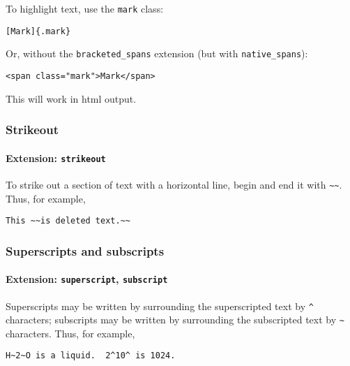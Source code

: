 \documentclass[
]{article}
\begin{document}
To highlight text, use the \texttt{mark} class:

\begin{verbatim}
[Mark]{.mark}
\end{verbatim}

Or, without the \texttt{bracketed\_spans} extension (but with
\texttt{native\_spans}):

\begin{verbatim}
<span class="mark">Mark</span>
\end{verbatim}

This will work in html output.

\subsubsection{Strikeout}\label{strikeout}

\paragraph{\texorpdfstring{Extension:
\texttt{strikeout}}{Extension: strikeout}}\label{extension-strikeout}

To strike out a section of text with a horizontal line, begin and end it
with \texttt{\textasciitilde{}\textasciitilde{}}. Thus, for example,

\begin{verbatim}
This ~~is deleted text.~~
\end{verbatim}

\subsubsection{Superscripts and
subscripts}\label{superscripts-and-subscripts}

\paragraph{\texorpdfstring{Extension: \texttt{superscript},
\texttt{subscript}}{Extension: superscript, subscript}}\label{extension-superscript-subscript}

Superscripts may be written by surrounding the superscripted text by
\texttt{\^{}} characters; subscripts may be written by surrounding the
subscripted text by \texttt{\textasciitilde{}} characters. Thus, for
example,

\begin{verbatim}
H~2~O is a liquid.  2^10^ is 1024.
\end{verbatim}
\end{document}
